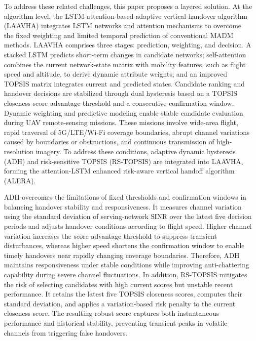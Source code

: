 \documentclass[10pt,a4paper]{article}
\begin{document}
To address these related challenges, this paper proposes a layered solution. At the algorithm level, the LSTM-attention-based adaptive vertical handover algorithm (LAAVHA) integrates LSTM networks and attention mechanisms to overcome the fixed weighting and limited temporal prediction of conventional MADM methods. LAAVHA comprises three stages: prediction, weighting, and decision. A stacked LSTM predicts short-term changes in candidate networks; self-attention combines the current network-state matrix with mobility features, such as flight speed and altitude, to derive dynamic attribute weights; and an improved TOPSIS matrix integrates current and predicted states. Candidate ranking and handover decisions are stabilized through dual hysteresis based on a TOPSIS closeness-score advantage threshold and a consecutive-confirmation window. Dynamic weighting and predictive modeling enable stable candidate evaluation during UAV remote-sensing missions. These missions involve wide-area flight, rapid traversal of 5G/LTE/Wi-Fi coverage boundaries, abrupt channel variations caused by boundaries or obstructions, and continuous transmission of high-resolution imagery. To address these conditions, adaptive dynamic hysteresis (ADH) and risk-sensitive TOPSIS (RS-TOPSIS) are integrated into LAAVHA, forming the attention-LSTM enhanced risk-aware vertical handoff algorithm (ALERA).

ADH overcomes the limitations of fixed thresholds and confirmation windows in balancing handover stability and responsiveness. It measures channel variation using the standard deviation of serving-network SINR over the latest five decision periods and adjusts handover conditions according to flight speed. Higher channel variation increases the score-advantage threshold to suppress transient disturbances, whereas higher speed shortens the confirmation window to enable timely handovers near rapidly changing coverage boundaries. Therefore, ADH maintains responsiveness under stable conditions while improving anti-chattering capability during severe channel fluctuations. In addition, RS-TOPSIS mitigates the risk of selecting candidates with high current scores but unstable recent performance. It retains the latest five TOPSIS closeness scores, computes their standard deviation, and applies a variation-based risk penalty to the current closeness score. The resulting robust score captures both instantaneous performance and historical stability, preventing transient peaks in volatile channels from triggering false handovers.
\end{document}
